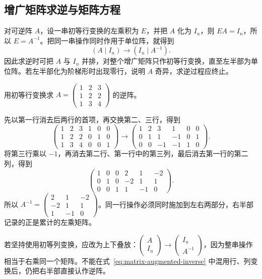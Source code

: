 \subsection{增广矩阵求逆与矩阵方程}

对可逆阵 $A$，设一串初等行变换的左乘积为 $E$，并把 $A$ 化为 $I_n$，则 $EA=I_n$，所以 $E=A^{-1}$。把同一串操作同时作用于单位阵，就得到
\begin{equation}
\label{eq:matrix-augmented-inverse}
    (A\mid I_n)\longrightarrow(I_n\mid A^{-1}).
\end{equation}
因此求逆时可把 $A$ 与 $I_n$ 并排，对整个增广矩阵只作初等行变换，直至左半部为单位阵。若左半部化为阶梯形时出现零行，说明 $A$ 奇异，求逆过程应终止。

\begin{example}
\label{ex:matrix-row-inverse}
用初等行变换求 $A=\begin{pmatrix}1&2&3\\1&2&2\\1&3&4\end{pmatrix}$ 的逆阵。
\end{example}

\begin{solve}
先以第一行消去后两行的首项，再交换第二、三行，得到
\[
    \left(\begin{array}{ccc|ccc}
        1&2&3&1&0&0\\1&2&2&0&1&0\\1&3&4&0&0&1
    \end{array}\right)
    \longrightarrow
    \left(\begin{array}{ccc|ccc}
        1&2&3&1&0&0\\0&1&1&-1&0&1\\0&0&-1&-1&1&0
    \end{array}\right).
\]
将第三行乘以 $-1$，再消去第二行、第一行中的第三列，最后消去第一行的第二列，得到
\[
    \left(\begin{array}{ccc|ccc}
        1&0&0&2&1&-2\\0&1&0&-2&1&1\\0&0&1&1&-1&0
    \end{array}\right).
\]
所以 $A^{-1}=\begin{pmatrix}2&1&-2\\-2&1&1\\1&-1&0\end{pmatrix}$。同一行操作必须同时施加到左右两部分，右半部记录的正是累计的左乘矩阵。
\end{solve}

若坚持使用初等列变换，应改为上下叠放：$\begin{pmatrix}A\\I_n\end{pmatrix}\longrightarrow\begin{pmatrix}I_n\\A^{-1}\end{pmatrix}$，因为整串操作相当于右乘同一个矩阵。不能在式~\eqref{eq:matrix-augmented-inverse} 中混用行、列变换后，仍把右半部直接认作逆阵。


